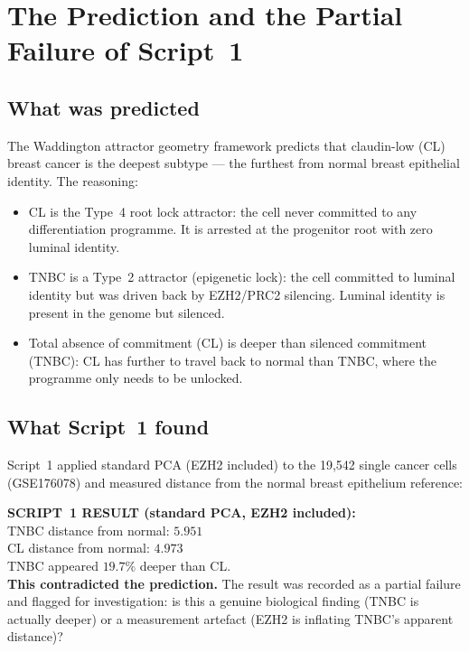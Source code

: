 \documentclass[12pt, a4paper]{article}
\begin{document}
\section{The Prediction and the Partial Failure
of Script~1}

\subsection{What was predicted}

The Waddington attractor geometry framework
predicts that claudin-low (CL) breast cancer
is the deepest subtype --- the furthest from
normal breast epithelial identity. The reasoning:

\begin{itemize}
    \item CL is the Type~4 root lock attractor:
    the cell never committed to any differentiation
    programme. It is arrested at the progenitor
    root with zero luminal identity.
    \item TNBC is a Type~2 attractor (epigenetic
    lock): the cell committed to luminal identity
    but was driven back by EZH2/PRC2 silencing.
    Luminal identity is present in the genome
    but silenced.
    \item Total absence of commitment (CL) is
    deeper than silenced commitment (TNBC):
    CL has further to travel back to normal
    than TNBC, where the programme only needs
    to be unlocked.
\end{itemize}

\subsection{What Script~1 found}

Script~1 applied standard PCA (EZH2 included)
to the 19,542 single cancer cells (GSE176078)
and measured distance from the normal breast
epithelium reference:

\begin{center}
\colorbox{artefactbox}{
\begin{minipage}{0.88\textwidth}
\vspace{0.5em}
\textbf{SCRIPT~1 RESULT (standard PCA, EZH2
included):}\\[0.4em]
TNBC distance from normal: $\mathbf{5.951}$\\
CL distance from normal: $\mathbf{4.973}$\\[0.3em]
TNBC appeared $19.7\%$ deeper than CL.\\[0.3em]
\textbf{This contradicted the prediction.}
The result was recorded as a partial failure
and flagged for investigation: is this a
genuine biological finding (TNBC is actually
deeper) or a measurement artefact (EZH2 is
inflating TNBC's apparent distance)?
\vspace{0.5em}
\end{minipage}}
\end{center}
\end{document}
